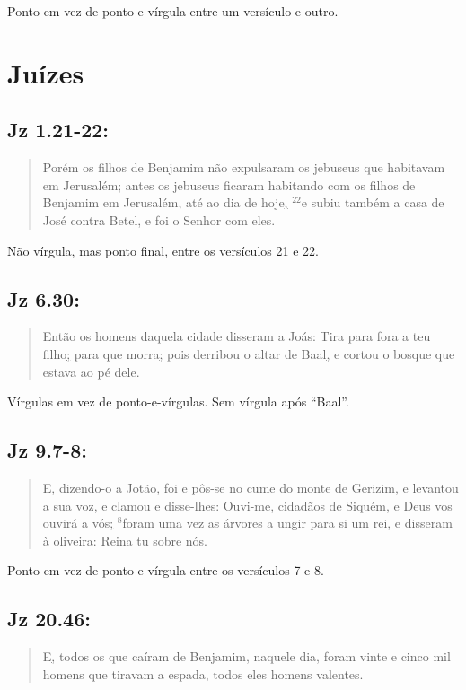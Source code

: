 Ponto em vez de ponto-e-vírgula entre um versículo e outro.

\section{Juízes}
\subsection*{Jz 1.21-22:} 
\begin{quote}
    \small
Porém os filhos de Benjamim não expulsaram os jebuseus que habitavam em Jerusalém; antes os jebuseus ficaram habitando com os filhos de Benjamim em Jerusalém, até ao dia de hoje\uline{,} $^{\mathrm{22}}$e subiu também a casa de José contra Betel, e foi o Senhor com eles.
\end{quote}

Não vírgula, mas ponto final, entre os versículos 21 e 22.

\subsection*{Jz 6.30:} 
\begin{quote}
    \small
    Então os homens daquela cidade disseram a Joás: Tira para fora a teu filho\uline{;} para que morra\uline{;} pois derribou o altar de Baal\uline{,} e cortou o bosque que estava ao pé dele.
\end{quote}

Vírgulas em vez de ponto-e-vírgulas. Sem vírgula após ``Baal''.

\subsection*{Jz 9.7-8:} 
\begin{quote}
    \small
    E, dizendo-o a Jotão, foi e pôs-se no cume do monte de Gerizim, e levantou a sua voz, e clamou e disse-lhes: Ouvi-me, cidadãos de Siquém, e Deus vos ouvirá a vós\uline{;} $^{\mathrm{8}}$foram uma vez as árvores a ungir para si um rei, e disseram à oliveira: Reina tu sobre nós.
\end{quote}

Ponto em vez de ponto-e-vírgula entre os versículos 7 e 8.

\subsection*{Jz 20.46:} 
\begin{quote}
    \small
   E\uline{,} todos os que caíram de Benjamim, naquele dia, foram vinte e cinco mil homens que tiravam a espada, todos eles homens valentes. 
\end{quote}

